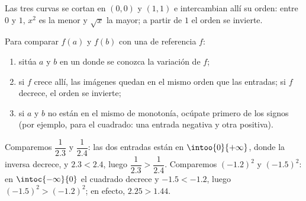 \begin{omfigure}

{\small Las tres curvas se cortan en $(0,0)$ y $(1,1)$ e intercambian allí
su orden: entre $0$ y $1$, $x^2$ es la menor y $\sqrt x$ la mayor; a
partir de $1$ el orden se invierte.}
\end{omfigure}

\begin{method}\label{met:g10:reffunc:compare}
Para comparar $f(a)$ y $f(b)$ con una  de referencia $f$:
\begin{enumerate}
  \item sitúa $a$ y $b$ en un  donde se conozca la variación de
        $f$;
  \item si $f$ crece allí, las imágenes quedan en el mismo orden que las
        entradas; si $f$ decrece, el orden se invierte;
  \item si $a$ y $b$ no están en el mismo  de monotonía, ocúpate
        primero de los signos (por ejemplo, para el cuadrado: una entrada
        negativa y otra positiva).
\end{enumerate}
\end{method}

\begin{example}
Comparemos $\dfrac{1}{2.3}$ y $\dfrac{1}{2.4}$: las dos entradas están en
$\intoo{0}{+\infty}$, donde la  inversa decrece, y $2.3 < 2.4$,
luego $\dfrac{1}{2.3} > \dfrac{1}{2.4}$. Comparemos $(-1.2)^2$ y
$(-1.5)^2$: en $\intoc{-\infty}{0}$ el cuadrado decrece y
$-1.5 < -1.2$, luego $(-1.5)^2 > (-1.2)^2$; en efecto, $2.25 > 1.44$.
\end{example}

